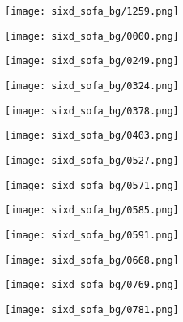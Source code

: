 \begin{figure}[h!]
  \centering
  \begin{subfigure}[b]{0.32\linewidth}
    \texttt{[image: sixd\_sofa\_bg/1259.png]}
  \end{subfigure}
  \begin{subfigure}[b]{0.32\linewidth}
    \texttt{[image: sixd\_sofa\_bg/0000.png]}
  \end{subfigure}
  \begin{subfigure}[b]{0.32\linewidth}
    \texttt{[image: sixd\_sofa\_bg/0249.png]}
  \end{subfigure}
  \begin{subfigure}[b]{0.32\linewidth}
    \texttt{[image: sixd\_sofa\_bg/0324.png]}
  \end{subfigure}
  \begin{subfigure}[b]{0.32\linewidth}
    \texttt{[image: sixd\_sofa\_bg/0378.png]}
  \end{subfigure}
  \begin{subfigure}[b]{0.32\linewidth}
    \texttt{[image: sixd\_sofa\_bg/0403.png]}
  \end{subfigure}
  \begin{subfigure}[b]{0.32\linewidth}
    \texttt{[image: sixd\_sofa\_bg/0527.png]}
  \end{subfigure}
  \begin{subfigure}[b]{0.32\linewidth}
    \texttt{[image: sixd\_sofa\_bg/0571.png]}
  \end{subfigure}
  \begin{subfigure}[b]{0.32\linewidth}
    \texttt{[image: sixd\_sofa\_bg/0585.png]}
  \end{subfigure}
  \begin{subfigure}[b]{0.32\linewidth}
    \texttt{[image: sixd\_sofa\_bg/0591.png]}
  \end{subfigure}
  \begin{subfigure}[b]{0.32\linewidth}
    \texttt{[image: sixd\_sofa\_bg/0668.png]}
  \end{subfigure}
  \begin{subfigure}[b]{0.32\linewidth}
    \texttt{[image: sixd\_sofa\_bg/0769.png]}
  \end{subfigure}
  \begin{subfigure}[b]{0.32\linewidth}
    \texttt{[image: sixd\_sofa\_bg/0781.png]}

\end{subfigure}
\end{figure}

